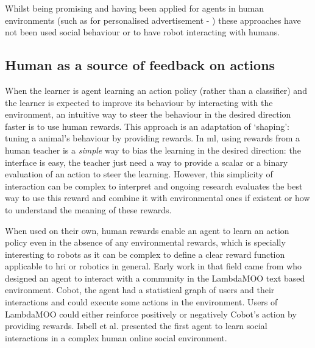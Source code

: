 	Whilst being promising and having been applied for agents in human environments (such as for personalised advertisement - \citealt{theocharous2015personalized})	these approaches have not been used social behaviour or to have robot interacting with humans.

\subsection{Human as a source of feedback on actions}

When the learner is agent learning an action policy (rather than a classifier) and the learner is expected to improve its behaviour by interacting with the environment, an intuitive way to steer the behaviour in the desired direction faster is to use human rewards. This approach is an adaptation of `shaping': tuning a animal's behaviour by providing rewards. In \gls{ml}, using rewards from a human teacher is a \textit{simple} way to bias the learning in the desired direction: the interface is easy, the teacher just need a way to provide a scalar or a binary evaluation of an action to steer the learning. However, this simplicity of interaction can be complex to interpret and ongoing research evaluates the best way to use this reward and combine it with environmental ones if existent \citep{knox2010combining} or how to understand the meaning of these rewards. 

When used on their own, human rewards enable an agent to learn an action policy even in the absence of any environmental rewards, which is specially interesting to robots as it can be complex to define a clear reward function applicable to \gls{hri} or robotics in general. Early work in that field came from \cite{isbell2006cobot} who designed an agent to interact with a community in the LambdaMOO text based environment. Cobot, the agent had a statistical graph of users and their interactions and could execute some actions in the environment. Users of LambdaMOO could either reinforce positively or negatively Cobot's action by providing rewards. Isbell et al. presented the first agent to learn social interactions in a complex human online social environment. 

